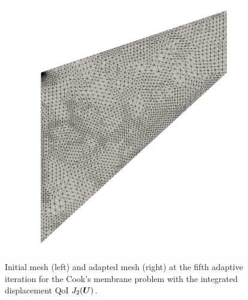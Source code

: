 \begin{figure}[ht!]
\begin{subfigure}{.5\textwidth}
\centering
\includegraphics[width=.99\linewidth]{img/mech_cooks_avg_u_final_mesh.png}
\end{subfigure}
\caption{Initial mesh (left) and adapted mesh (right) at the fifth adaptive
iteration for the Cook's membrane problem with the integrated displacement
QoI $J_2(\boldsymbol{U})$.}
\label{fig:mech_cooks_avg_u_meshes}
\end{figure}

